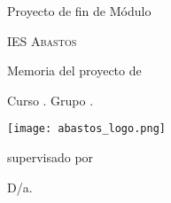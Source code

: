 \begin{titlepage}
	\centering
	\vfill
	Proyecto de fin de Módulo
	\vfill
	\vspace{2cm}
	{\Huge\bfseries\titulo \par}
	\vspace{0.5cm}
	{\huge\bfseries \subtitulo \par}
	\vspace{0.5cm}
	{\Large\itshape \autor \par}
	\vfill
	\vfill
	{\centering\scshape\LARGE\hspace{6cm} IES Abastos \par}
	{\centering\hspace{6cm} Memoria del proyecto de \siglasModulo\par}
	{\centering\hspace{6cm} Curso \curso. Grupo \grupo. \par}
	{\centering\hspace{6cm}\fechaExpo\par}
	\vspace{0.2cm}
	\hspace{6cm}\texttt{[image: abastos\_logo.png]}\par
	\centering\hspace{6cm}supervisado por\par
	\centering\hspace{6cm}D/a.~\tutorNombre\textsc{~\tutorApellido}


\end{titlepage}
